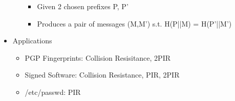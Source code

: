 \begin{itemize}
\begin{itemize}
        \begin{itemize}
        \item Given 2 chosen prefixes P, P'
        \item Produces a pair of messages (M,M') s.t. H(P||M) = H(P'||M')
        \end{itemize}
    \end{itemize}
\item Applications
    \begin{itemize}
    \item PGP Fingerprints: Collision Resisitance, 2PIR
    \item Signed Software: Collision Resistance, PIR, 2PIR
    \item /etc/passwd: PIR
    \end{itemize}
\end{itemize}